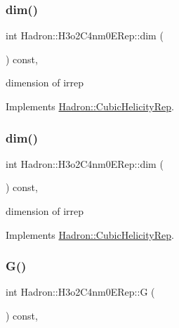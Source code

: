 \subsubsection{\texorpdfstring{dim()}{dim()}\hspace{0.1cm}{\footnotesize\ttfamily [1/2]}}
{\footnotesize\ttfamily int Hadron\+::\+H3o2\+C4nm0\+E\+Rep\+::dim (\begin{DoxyParamCaption}{ }\end{DoxyParamCaption}) const\hspace{0.3cm}{\ttfamily [inline]}, {\ttfamily [virtual]}}

dimension of irrep 

Implements \mbox{\hyperlink{structHadron_1_1CubicHelicityRep_a95d229a05580e65f8bdde74a1e316855}{Hadron\+::\+Cubic\+Helicity\+Rep}}.

\mbox{\label{structHadron_1_1H3o2C4nm0ERep_a7ee17e5a57ef66d6ed9343f61a10721b}} 
\subsubsection{\texorpdfstring{dim()}{dim()}\hspace{0.1cm}{\footnotesize\ttfamily [2/2]}}
{\footnotesize\ttfamily int Hadron\+::\+H3o2\+C4nm0\+E\+Rep\+::dim (\begin{DoxyParamCaption}{ }\end{DoxyParamCaption}) const\hspace{0.3cm}{\ttfamily [inline]}, {\ttfamily [virtual]}}

dimension of irrep 

Implements \mbox{\hyperlink{structHadron_1_1CubicHelicityRep_a95d229a05580e65f8bdde74a1e316855}{Hadron\+::\+Cubic\+Helicity\+Rep}}.

\mbox{\label{structHadron_1_1H3o2C4nm0ERep_a0dbed874e65f17f90f2b09c97b54f679}} 
\subsubsection{\texorpdfstring{G()}{G()}\hspace{0.1cm}{\footnotesize\ttfamily [1/2]}}
{\footnotesize\ttfamily int Hadron\+::\+H3o2\+C4nm0\+E\+Rep\+::G (\begin{DoxyParamCaption}{ }\end{DoxyParamCaption}) const\hspace{0.3cm}{\ttfamily [inline]}, {\ttfamily [virtual]}}

